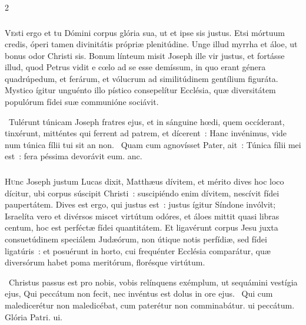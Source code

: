 \documentclass[9pt,twoside]{extarticle}
\begin{document}
\begin{multicols}{2}
\subsubsection*{\center {}}
\lettrine{V}esti ergo et tu Dómini corpus glória sua, ut et ipse sis justus. Etsi mórtuum credis, óperi tamen divinitátis própriæ plenitúdine. Unge illud myrrha et áloe, ut bonus odor Christi sis. Bonum línteum misit Joseph ille vir justus, et fortásse illud, quod Petrus vidit e cœlo ad se esse demíssum, in quo erant génera quadrúpedum, et ferárum, et vólucrum ad similitúdinem gentílium figuráta. Mystico ígitur unguénto illo pístico consepelítur Ecclésia, quæ diversitátem populórum fídei suæ communióne sociávit.

\begin{tightlist}{}
\item {}~Tulérunt túnicam Joseph fratres ejus, et in sánguine hœdi, quem occíderant, tinxérunt, mitténtes qui ferrent ad patrem, et dícerent~: \textred{*} Hanc invénimus, vide num túnica fílii tui sit an non. ~Quam cum agnovísset Pater, ait~: Túnica fílii mei est~: fera péssima devorávit eum. anc.
\end{tightlist}

\subsubsection*{\center {}}
\lettrine{H}unc Joseph justum Lucas dixit, Matthæus dívitem, et mérito dives hoc loco dícitur, ubi corpus súscipit Christi~: suscipiéndo enim dívitem, nescívit fídei paupertátem. Dives est ergo, qui justus est~: justus ígitur Síndone invólvit; Israelíta vero et divérsos miscet virtútum odóres, et áloes mittit quasi libras centum, hoc est perféctæ fídei quantitátem. Et ligavérunt corpus Jesu juxta consuetúdinem speciálem Judæórum, non útique notis perfídiæ, sed fídei ligatúris~: et posuérunt in horto, cui frequénter Ecclésia comparátur, quæ diversórum habet poma meritórum, florésque virtútum.

\begin{tightlist}{}
\item {}~Christus passus est pro nobis, vobis relínquens exémplum, ut sequámini vestígia ejus, \textred{*} Qui peccátum non fecit, nec invéntus est dolus in ore ejus. ~Qui cum maledicerétur non maledicébat, cum paterétur non comminabátur. ui peccátum. Glória Patri. ui.
\end{tightlist}


\end{multicols}
\end{document}
